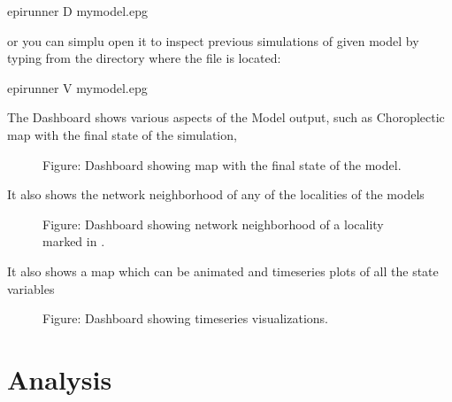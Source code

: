 \documentclass[letterpaper,10pt,english]{sphinxmanual}
\begin{document}
\begin{sphinxVerbatim}[commandchars=\\\{\}]
\PYGZdl{} epirunner \PYGZhy{}D mymodel.epg
\end{sphinxVerbatim}

or you can simplu open it to inspect previous simulations of given model by typing from the directory where the  file is located:

\begin{sphinxVerbatim}[commandchars=\\\{\}]
\PYGZdl{} epirunner \PYGZhy{}V mymodel.epg
\end{sphinxVerbatim}

The Dashboard shows various aspects of the Model output, such as Choroplectic map with the final state of the simulation,

\begin{figure}[htbp]
\centering
\capstart

\noindent{}
\caption{Figure: Dashboard showing map with the final state of the model.}\label{\detokenize{using:id1}}\end{figure}

It also shows the network neighborhood of any of the localities of the models

\begin{figure}[htbp]
\centering
\capstart

\noindent{}
\caption{Figure: Dashboard showing network neighborhood of a locality marked in .}\label{\detokenize{using:id2}}\end{figure}

It also shows a map which can be animated and timeseries plots of all the state variables

\begin{figure}[htbp]
\centering
\capstart

\noindent{}
\caption{Figure: Dashboard showing timeseries visualizations.}\label{\detokenize{using:id3}}\end{figure}


\chapter{Analysis}
\label{\detokenize{analysis:analysis}}\label{\detokenize{analysis:id1}}\label{\detokenize{analysis::doc}}
\end{document}
